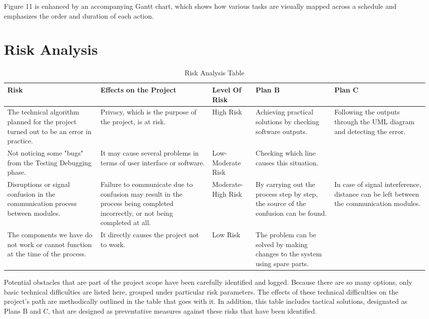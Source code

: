 \documentclass[12pt]{article}
\begin{document}
	Figure 11 is enhanced by an accompanying Gantt chart, which shows how various tasks are visually mapped across a schedule and emphasizes the order and duration of each action. 
	
	\newpage
	\section{Risk Analysis}
	
	\begin{table}[H]
		\centering
		\renewcommand{\arraystretch}{0.2}
		
		\begin{tabular}{|p{3cm}|p{3cm}|p{1.6cm}|p{2cm}|p{2cm}|}
			\hline
			Risk  & Effects on the Project  & Level Of Risk  & Plan B & Plan C  \\
			\hline
			
			
			The technical algorithm planned for the project turned out to be an error in practice.  & Privacy, which is the purpose of the project, is at risk.  & High Risk  & Achieving practical solutions by checking software outputs. & Following the outputs through the UML diagram and detecting the error.  \\	\hline
			Not noticing some "bugs" from the Testing Debugging phase.  & It may cause several problems in terms of user interface or software.  & Low-Moderate Risk  & Checking which line causes this situation. &   \\	\hline
			Disruptions or signal confusion in the communication process between modules.  & Failure to communicate due to confusion may result in the process being completed incorrectly, or not being completed at all.  & Moderate-High Risk& By carrying out the process step by step, the source of the confusion can be found.  & In case of signal interference, distance can be left between the communication modules.  \\	\hline
			The components we have do not work or cannot function at the time of the process. & It directly causes the project not to work.  & Low Risk  & The problem can be solved by making changes to the system using spare parts.  &   \\
			\hline
			
			
			
			
		\end{tabular}
		\caption{Risk Analysis Table}
	\end{table}
	Potential obstacles that are part of the project scope have been carefully identified and logged. Because there are so many options, only basic technical difficulties are listed here, grouped under particular risk parameters. The effects of these technical difficulties on the project's path are methodically outlined in the table that goes with it. In addition, this table includes tactical solutions, designated as Plans B and C, that are designed as preventative measures against these risks that have been identified.
	\newpage
\end{document}
